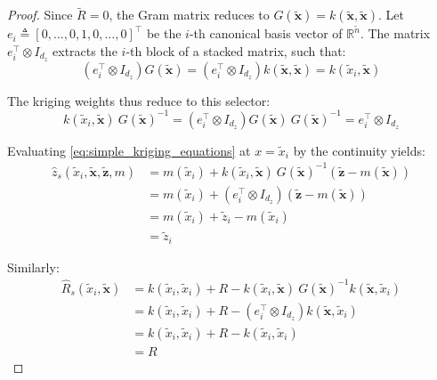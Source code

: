 \begin{proof}
	Since $\tilde{R}=0$, the Gram matrix reduces to $G(\tilde{\mathbf{x}})=k(\tilde{\mathbf{x}},\tilde{\mathbf{x}})$. Let $e_i\triangleq[0,\dots,0,1,0,\dots,0]^\top$ be the $i$-th canonical basis vector of $\mathbb{R}^{\tilde{n}}$. The matrix $e_i^\top\otimes I_{d_z}$ extracts the $i$-th block of a stacked matrix, such that:
	\begin{equation}
		\left(e_i^\top\otimes I_{d_z}\right)G(\tilde{\mathbf{x}})=\left(e_i^\top\otimes I_{d_z}\right)k(\tilde{\mathbf{x}},\tilde{\mathbf{x}})=k(\tilde{x}_i,\tilde{\mathbf{x}})
	\end{equation}

	The kriging weights thus reduce to this selector:
	\begin{equation}
		k(\tilde{x}_i,\tilde{\mathbf{x}})\:G(\tilde{\mathbf{x}})^{-1}=\left(e_i^\top\otimes I_{d_z}\right)G(\tilde{\mathbf{x}})\:G(\tilde{\mathbf{x}})^{-1}=e_i^\top\otimes I_{d_z}
	\end{equation}

	Evaluating \eqref{eq:simple_kriging_equations} at $x=\tilde{x}_i$ by the continuity yields:
	\begin{equation}
		\begin{aligned}
			\hat{z}_s(\tilde{x}_i,\tilde{\mathbf{x}},\tilde{\mathbf{z}},m)&=m(\tilde{x}_i)+k(\tilde{x}_i,\tilde{\mathbf{x}})\:G(\tilde{\mathbf{x}})^{-1}\left(\tilde{\mathbf{z}}-m(\tilde{\mathbf{x}})\right)\\
			&=m(\tilde{x}_i)+\left(e_i^\top\otimes I_{d_z}\right)\left(\tilde{\mathbf{z}}-m(\tilde{\mathbf{x}})\right)\\
			&=m(\tilde{x}_i)+\tilde{z}_i-m(\tilde{x}_i)\\
			&=\tilde{z}_i
		\end{aligned}
	\end{equation}

	Similarly:
	\begin{equation}
		\begin{aligned}
			\hat{R}_s(\tilde{x}_i,\tilde{\mathbf{x}})&=k(\tilde{x}_i,\tilde{x}_i)+R-k(\tilde{x}_i,\tilde{\mathbf{x}})\:G(\tilde{\mathbf{x}})^{-1}k(\tilde{\mathbf{x}},\tilde{x}_i)\\
			&=k(\tilde{x}_i,\tilde{x}_i)+R-\left(e_i^\top\otimes I_{d_z}\right)k(\tilde{\mathbf{x}},\tilde{x}_i)\\
			&=k(\tilde{x}_i,\tilde{x}_i)+R-k(\tilde{x}_i,\tilde{x}_i)\\
			&=R
		\end{aligned}
	\end{equation}
\end{proof}


